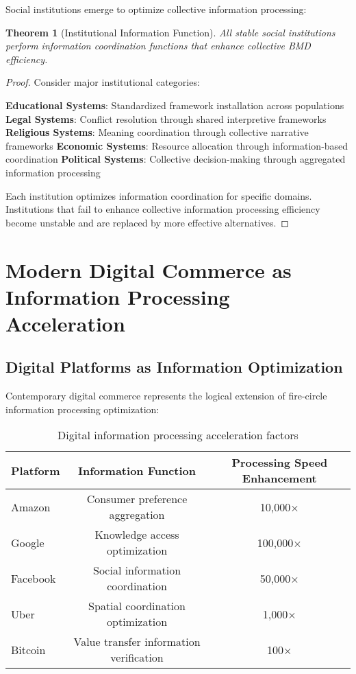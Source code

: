 \documentclass[12pt,a4paper]{article}
\newtheorem{theorem}{Theorem}
\begin{document}
Social institutions emerge to optimize collective information processing:

\begin{theorem}[Institutional Information Function]
All stable social institutions perform information coordination functions that enhance collective BMD efficiency.
\end{theorem}

\begin{proof}
Consider major institutional categories:

\textbf{Educational Systems}: Standardized framework installation across populations
\textbf{Legal Systems}: Conflict resolution through shared interpretive frameworks  
\textbf{Religious Systems}: Meaning coordination through collective narrative frameworks
\textbf{Economic Systems}: Resource allocation through information-based coordination
\textbf{Political Systems}: Collective decision-making through aggregated information processing

Each institution optimizes information coordination for specific domains. Institutions that fail to enhance collective information processing efficiency become unstable and are replaced by more effective alternatives.
\end{proof}

\section{Modern Digital Commerce as Information Processing Acceleration}

\subsection{Digital Platforms as Information Optimization}

Contemporary digital commerce represents the logical extension of fire-circle information processing optimization:

\begin{table}[H]
\centering
\begin{tabular}{lcc}
\toprule
\textbf{Platform} & \textbf{Information Function} & \textbf{Processing Speed Enhancement} \\
\midrule
Amazon & Consumer preference aggregation & 10,000× \\
Google & Knowledge access optimization & 100,000× \\
Facebook & Social information coordination & 50,000× \\
Uber & Spatial coordination optimization & 1,000× \\
Bitcoin & Value transfer information verification & 100× \\
\bottomrule
\end{tabular}
\caption{Digital information processing acceleration factors}
\end{table}
\end{document}
